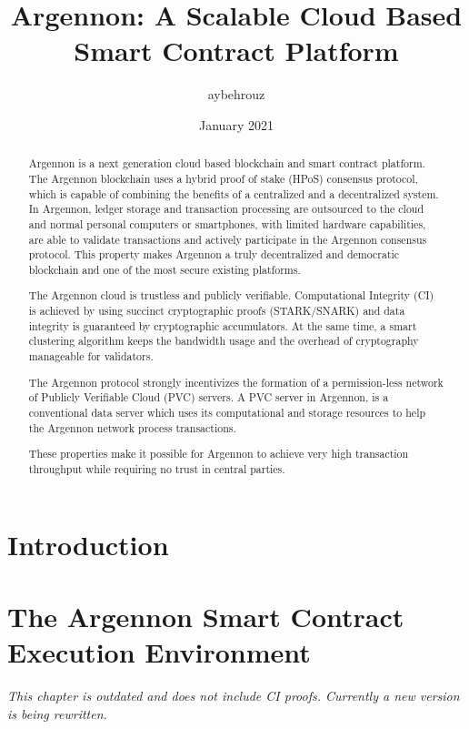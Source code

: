 \documentclass[11pt, a4paper]{report}
\title{Argennon: A Scalable Cloud Based Smart Contract Platform}
\author{aybehrouz}
\date{January 2021}
\newcommand{\note}[1] {
    \begin{tcolorbox}[colframe=white,colback=white]
        \emph{#1}
    \end{tcolorbox}
}
\begin{document}
    \maketitle
    \begin{abstract}
        Argennon is a next generation cloud based blockchain and smart
        contract platform. The Argennon blockchain uses
        a hybrid proof of stake (HPoS) consensus protocol, which is capable of combining the benefits of
        a centralized and a decentralized system. In Argennon, ledger storage and transaction processing are
        outsourced to the cloud and normal personal computers or smartphones, with limited hardware
        capabilities, are able to validate transactions and actively
        participate in the Argennon consensus protocol. This property makes Argennon a truly decentralized and
        democratic blockchain and one of the most secure existing platforms.

        The Argennon cloud is trustless and publicly verifiable. Computational Integrity (CI) is
        achieved by using succinct cryptographic proofs (STARK/SNARK)
        and data integrity is guaranteed by cryptographic accumulators. At the same time, a smart
        clustering algorithm keeps the bandwidth usage and the overhead of cryptography manageable
        for validators.

        The Argennon protocol strongly incentivizes the formation of a permission-less network of Publicly Verifiable
        Cloud (PVC) servers. A PVC server in Argennon, is a conventional data server which uses its computational and
        storage resources to help the Argennon network process transactions.
        
        These properties make it possible for Argennon to achieve very high transaction throughput while requiring no trust
        in central parties.  
    \end{abstract}
    \tableofcontents


    \chapter{Introduction}\label{ch:intro}
    

    \chapter{The Argennon Smart Contract Execution Environment}\label{ch:AVM}
    \note{This chapter is outdated and does not include CI proofs. Currently a new version is being rewritten.}
    
\end{document}
